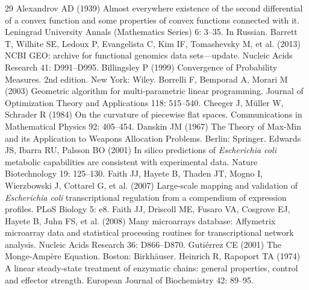 \begin{thebibliography}{29}
\setlength{\itemsep}{2pt}
\small
{}
Alexandrov AD (1939) Almost everywhere existence of the second differential of a
             convex function and some properties of convex functions
             connected with it. Leningrad University Annals (Mathematics Series) 6: 3--35. In Russian.
Barrett T, Wilhite SE, Ledoux P, Evangelista C, Kim IF, Tomashevsky M, et al. (2013) {NCBI GEO}: archive for functional genomics data sets---update. Nucleic Acids Research 41: D991--D995.
Billingsley P (1999) Convergence of Probability Measures. 2nd edition. New York: Wiley.
Borrelli F, Bemporad A, Morari M (2003) Geometric algorithm for multi-parametric linear
             programming. Journal of Optimization Theory and Applications 118: 515--540.
Cheeger J, M{\"u}ller W, Schrader R (1984) On the curvature of piecewise flat spaces. Communications in Mathematical Physics 92: 405--454.
Danskin JM (1967) The Theory of Max-Min and its Application to Weapons
               Allocation Problems. Berlin: Springer.
Edwards JS, Ibarra RU, Palsson BO (2001) In silico predictions of \emph{Escherichia coli} metabolic
             capabilities are consistent with experimental data. Nature Biotechnology 19: 125--130.
Faith JJ, Hayete B, Thaden JT, Mogno I, Wierzbowski J, Cottarel G, et al. (2007) Large-scale mapping and validation of \emph{Escherichia coli}
             transcriptional regulation from a compendium of expression
             profiles. PLoS Biology 5: e8.
Faith JJ, Driscoll ME, Fusaro VA, Cosgrove EJ, Hayete B, Juhn FS, et al. (2008) Many microarrays database: Affymetrix microarray data and
             statistical processing routines for transcriptional network
             analysis. Nucleic Acids Research 36: D866--D870.
Guti{\'e}rrez CE (2001) The Monge-Amp{\`e}re Equation. Boston: Birkh{\"a}user.
Heinrich R, Rapoport TA (1974) A linear steady-state treatment of enzymatic chains: general
             properties, control and effector strength. European Journal of Biochemistry 42: 89--95.

\end{thebibliography}
